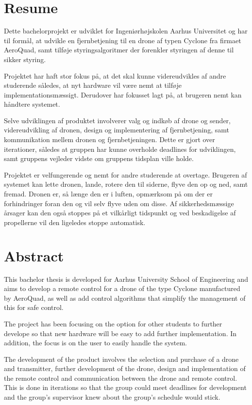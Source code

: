 \documentclass[Main]{subfiles}
\begin{document}
\chapter*{Resume}

Dette bachelorprojekt er udviklet for Ingeniørhøjskolen Aarhus Universitet og har til formål, at udvikle en fjernbetjening til en drone af typen Cyclone fra firmaet AeroQuad, samt tilføje styringsalgoritmer der forenkler styringen af denne til sikker styring.

Projektet har haft stor fokus på, at det skal kunne videreudvikles af andre studerende således, at nyt hardware vil være nemt at tilføje implementationsmæssigt.
Derudover har fokusset lagt på, at brugeren nemt kan håndtere systemet.

Selve udviklingen af produktet involverer valg og indkøb af drone og sender, videreudvikling af dronen, design og implementering af fjern\-betjening, samt kommunikation mellem dronen og fjernbetjeningen.
Dette er gjort over iterationer, således at gruppen har kunne overholde deadlines for udviklingen, samt gruppens vejleder vidste om gruppens tidsplan ville holde.

Projektet er velfungerende og nemt for andre studerende at overtage.
Brugeren af systemet kan lette dronen, lande, rotere den til siderne, flyve den op og ned, samt fremad.
Dronen er, så længe den er i luften, opmærksom på om der er forhindringer foran den og vil  selv flyve uden om disse.
Af sikkerhedsmæssige årsager kan den også stoppes på et vilkårligt tidspunkt og ved beskadigelse af propellerne vil den ligeledes stoppe automatisk.




\chapter*{Abstract}

This bachelor thesis is developed for Aarhus University School of Engineering and aims to develop a remote control for a drone of the type Cyclone manufactured by AeroQuad, as well as add control algorithms that simplify the management of this for safe control.

The project has been focusing on the option for other students to further develope so that new hardware will be easy to add further implementation.
In addition, the focus is on the user to easily handle the system.

The development of the product involves the selection and purchase of a drone and transmitter,  further development of the drone, design and implementation of the remote control and communication between the drone and remote control.
This is done in iterations so that the group could meet deadlines for development and the group's supervisor knew about the group's schedule would stick.
\end{document}
